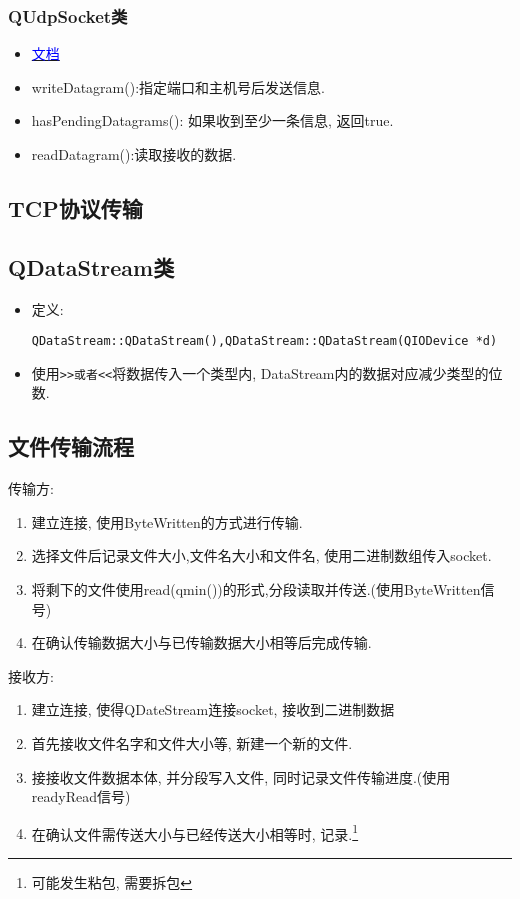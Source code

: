 \documentclass[11pt]{article}
\begin{document}
\subsubsection{QUdpSocket类}
\begin{itemize}
\item 
\href{https://doc.qt.io/qt-6/qudpsocket.html#details}{
\textcolor{blue}{文档}}
\item writeDatagram():指定端口和主机号后发送信息.
\item hasPendingDatagrams(): 如果收到至少一条信息, 返回true.
\item readDatagram():读取接收的数据.
\end{itemize}

\subsection{TCP协议传输}


\subsection{QDataStream类}
\begin{itemize}
\item 定义:
\begin{verbatim}
QDataStream::QDataStream(),QDataStream::QDataStream(QIODevice *d)
\end{verbatim}
\item 使用\verb|>>或者<<|将数据传入一个类型内, DataStream内的数据对应减少类型的位数.
\end{itemize}


\subsection{文件传输流程}
传输方:
\begin{enumerate}
\item 建立连接, 使用ByteWritten的方式进行传输.
\item 选择文件后记录文件大小,文件名大小和文件名, 使用二进制数组传入socket.
\item 将剩下的文件使用read(qmin())的形式,分段读取并传送.(使用ByteWritten信号)
\item 在确认传输数据大小与已传输数据大小相等后完成传输.
\end{enumerate}
接收方:
\begin{enumerate}
\item 建立连接, 使得QDateStream连接socket, 接收到二进制数据
\item 首先接收文件名字和文件大小等, 新建一个新的文件.
\item 接接收文件数据本体, 并分段写入文件, 同时记录文件传输进度.(使用readyRead信号)
\item 在确认文件需传送大小与已经传送大小相等时, 记录.\footnote{可能发生粘包, 需要拆包}
\end{enumerate}
\end{document}
